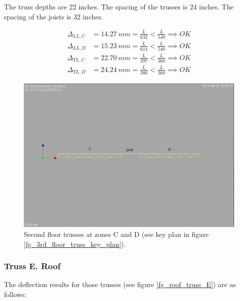 \noindent The truss depths are 22 inches. The spacing of the trusses is 24 inches. The spacing of the joists is 32 inches. 

\begin{align}
\Delta_{LL,C} &= 14.27\ mm= \frac{L}{632} < \frac{L}{540} \implies OK \\
\Delta_{LL,D} &= 15.23\ mm= \frac{L}{614} < \frac{L}{540} \implies OK \\
\Delta_{TL,C} &= 22.70\ mm= \frac{L}{397} < \frac{L}{360} \implies OK \\
\Delta_{TL,D} &= 24.24\ mm= \frac{L}{386} < \frac{L}{360} \implies OK
\end{align}

\begin{figure}
  \begin{center}
  \includegraphics[width=120mm]{figures/trusses/2nd_floor_truss_CD}
  \end{center}
  \caption{Second floor trusses at zones C and D (see key plan in figure \ref{fg_3rd_floor_truss_key_plan}).}\label{fg_2nd_floor_truss_CD}
\end{figure}

\subsubsection{Truss E. Roof}
The deflection results for those trusses (see figure \ref{fg_roof_truss_E}) are as follows:

